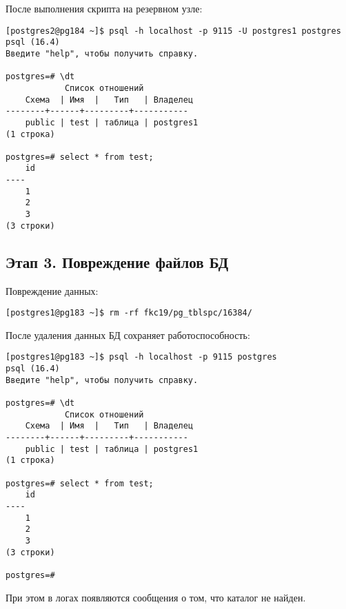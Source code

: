 После выполнения скрипта на резервном узле:

\begin{verbatim}
[postgres2@pg184 ~]$ psql -h localhost -p 9115 -U postgres1 postgres
psql (16.4)
Введите "help", чтобы получить справку.

postgres=# \dt
            Список отношений
    Схема  | Имя  |   Тип   | Владелец
--------+------+---------+-----------
    public | test | таблица | postgres1
(1 строка)

postgres=# select * from test;
    id
----
    1
    2
    3
(3 строки)
\end{verbatim}

\subsection{Этап 3. Повреждение файлов БД}

Повреждение данных:
\begin{verbatim}
[postgres1@pg183 ~]$ rm -rf fkc19/pg_tblspc/16384/
\end{verbatim}

После удаления данных БД сохраняет работоспособность:

\begin{verbatim}
[postgres1@pg183 ~]$ psql -h localhost -p 9115 postgres
psql (16.4)
Введите "help", чтобы получить справку.

postgres=# \dt
            Список отношений
    Схема  | Имя  |   Тип   | Владелец
--------+------+---------+-----------
    public | test | таблица | postgres1
(1 строка)

postgres=# select * from test;
    id
----
    1
    2
    3
(3 строки)

postgres=#
\end{verbatim}

При этом в логах появляются сообщения о том, что каталог не найден.

